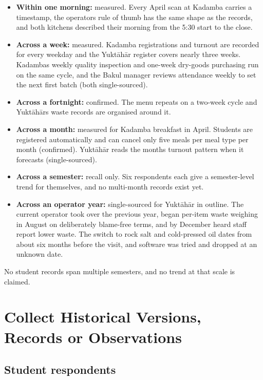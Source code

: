 \documentclass[
  10pt,
  table]{article}
\providecommand{\tightlist}{%
  \setlength{\itemsep}{0pt}\setlength{\parskip}{0pt}}
\renewcommand{\tightlist}{\setlength{\itemsep}{1.5pt}\setlength{\parskip}{0pt}}
\begin{document}
\begin{itemize}
\tightlist
\item
  \textbf{Within one morning:} measured. Every April scan at Kadamba carries a timestamp, the operator\textquotesingle s rule of thumb has the same shape as the records, and both kitchens described their morning from the 5:30 start to the close.
\item
  \textbf{Across a week:} measured. Kadamba registrations and turnout are recorded for every weekday and the Yuktāhār register covers nearly three weeks. Kadamba\textquotesingle s weekly quality inspection and one-week dry-goods purchasing run on the same cycle, and the Bakul manager reviews attendance weekly to set the next first batch (both single-sourced).
\item
  \textbf{Across a fortnight:} confirmed. The menu repeats on a two-week cycle and Yuktāhār\textquotesingle s waste records are organised around it.
\item
  \textbf{Across a month:} measured for Kadamba breakfast in April. Students are registered automatically and can cancel only five meals per meal type per month (confirmed). Yuktāhār reads the month\textquotesingle s turnout pattern when it forecasts (single-sourced).
\item
  \textbf{Across a semester:} recall only. Six respondents each give a semester-level trend for themselves, and no multi-month records exist yet.
\item
  \textbf{Across an operator year:} single-sourced for Yuktāhār in outline. The current operator took over the previous year, began per-item waste weighing in August on deliberately blame-free terms, and by December heard staff report lower waste. The switch to rock salt and cold-pressed oil dates from about six months before the visit, and software was tried and dropped at an unknown date.
\end{itemize}

No student records span multiple semesters, and no trend at that scale is claimed.

\section{Collect Historical Versions, Records or Observations}\label{collect-historical-versions-records-or-observations}

\subsection{Student respondents}\label{student-respondents}
\end{document}
